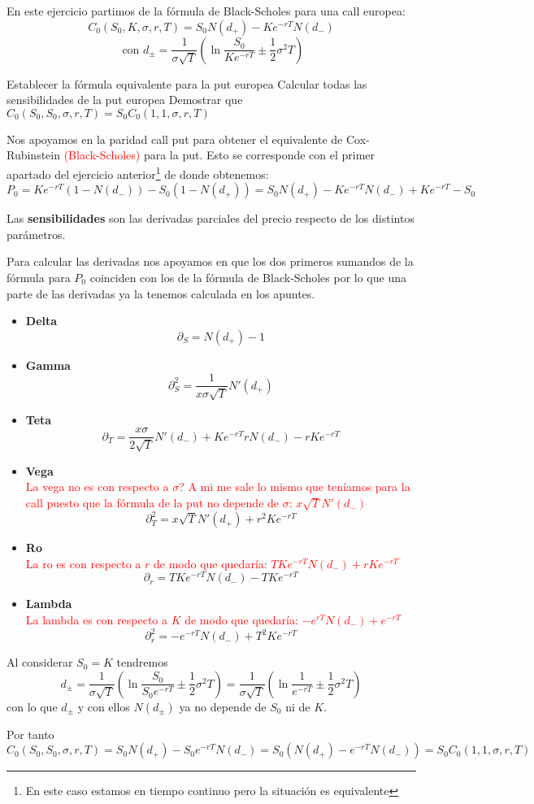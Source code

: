 \begin{problem}[2]
En este ejercicio partimos de la fórmula de Black-Scholes para una call europea:
\[C_0(S_0,K,σ,r,T)=S_0N(d_+)-Ke^{-rT}N(d_-) \]
\[\text{   con } d_{\pm} = \frac{1}{σ\sqrt{T}}\left( \ln \frac{S_0}{Ke^{-rT}}\pm \frac{1}{2}σ^2T\right)\]

\ppart Establecer la fórmula equivalente para la put europea
\ppart Calcular todas las sensibilidades de la put europea
\ppart Demostrar que $C_0(S_0,S_0,σ,r,T)=S_0C_0(1,1,σ,r,T)$
\solution
{}

\spart

Nos apoyamos en la paridad call put para obtener el equivalente de Cox-Rubinstein \textcolor{red}{(Black-Scholes)} para la put. Esto se corresponde con el primer apartado del ejercicio anterior\footnote{En este caso estamos en tiempo continuo pero la situación es equivalente} de donde obtenemos:
\[P_0 = Ke^{-rT}(1-N(d_-))-S_0(1-N(d_+)) = S_0N(d_+) -Ke^{-rT}N(d_-)+Ke^{-rT} -S_0 \]

\spart

Las \textbf{sensibilidades} son las derivadas parciales del precio respecto de los distintos parámetros.

Para calcular las derivadas nos apoyamos en que los dos primeros sumandos de la fórmula para $P_0$ coinciden con los de la fórmula de Black-Scholes por lo que una parte de las derivadas ya la tenemos calculada en los apuntes.
\begin{itemize}
\item \textbf{Delta}
\[\partial_S = N(d_+)-1\]
\item \textbf{Gamma}
\[\partial^2_S = \frac{1}{xσ\sqrt{T}}N'(d_+)\]
\item \textbf{Teta}
\[\partial_T = \frac{xσ}{2\sqrt{T}}N'(d_-) + Ke^{-rT}rN(d_-)-rKe^{-rT}\]
\item \textbf{Vega}\\
\textcolor{red}{La vega no es con respecto a $\sigma$? A mi me sale lo mismo que teníamos para la call puesto que la fórmula de la put no depende de $\sigma$: $x\sqrt{T}N'(d_{-})$}
\[\partial^2_T = x\sqrt{T}N'(d_+)+r^2Ke^{-rT}\]
\item \textbf{Ro}\\
\textcolor{red}{La ro es con respecto a $r$ de modo que quedaría: $TKe^{-rT}N(d_-)+rKe^{-rT}$ }
\[\partial_r = TKe^{-rT}N(d_-)-TKe^{-rT}\]
\item \textbf{Lambda}\\
\textcolor{red}{La lambda es con respecto a $K$ de modo que quedaría: $-e^{rT}N(d_{-})+e^{-rT}$}
\[\partial^2_r = -e^{-rT}N(d_-)+T^2Ke^{-rT}\]
\end{itemize}

\spart

Al considerar $S_0=K$ tendremos
\[d_{\pm} = \frac{1}{σ\sqrt{T}}\left( \ln \frac{S_0}{S_0e^{-rT}}\pm \frac{1}{2}σ^2T\right)  = \frac{1}{σ\sqrt{T}}\left( \ln \frac{1}{e^{-rT}}\pm \frac{1}{2}σ^2T\right)\]
con lo que $d_{\pm}$ y con ellos $N(d_{\pm})$ ya no depende de $S_0$ ni de $K$.

Por tanto
\[C_0(S_0,S_0,σ,r,T) = S_0N(d_+)-S_0e^{-rT}N(d_-) = S_0\left(N(d_+)-e^{-rT}N(d_-) \right) = S_0 C_0(1,1,σ,r,T)\]
\end{problem}

